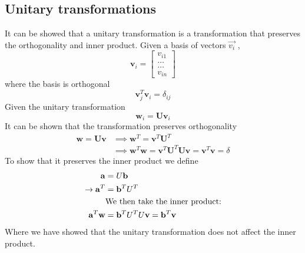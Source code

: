 \documentclass[%
reprint,
amsmath, 
amssymb, 
aps,]{revtex4-1}
\begin{document}
		\subsection{Unitary transformations} \noindent 
It can be showed that a unitary transformation is a transformation that preserves the orthogonality and inner product. Given a basis of vectors $\vec{v_i}$ ,
			\begin{equation*}
	\mathbf{v}_i = \begin{bmatrix} v_{i1} \\ \dots \\ \dots \\v_{in} \end{bmatrix}
			\end{equation*}
where the basis is orthogonal 
			\begin{equation*}
	\mathbf{v}_j^T\mathbf{v}_i = \delta_{ij}
			\end{equation*}
Given the unitary transformation 
			\begin{equation*}
	\mathbf{w}_i=\mathbf{U}\mathbf{v}_i
			\end{equation*}
It can be shown that the transformation preserves orthogonality
			\begin{align*}
	\mathbf{w}=\mathbf{U}\mathbf{v} &\implies \mathbf{w}^T=\mathbf{v}^T\mathbf{U}^T \\ &\implies \mathbf{w}^T\mathbf{w} = \mathbf{v}^T\mathbf{U}^T\mathbf{U}\mathbf{v} = \mathbf{v}^T\mathbf{v} = \delta
			\end{align*}
To show that it preserves the inner product we define 
			\begin{align*}
	\mathbf{a} &= U\mathbf{b} \\
	\rightarrow \mathbf{a}^T &= \mathbf{b}^TU^T \\
	&\textnormal{We then take the inner product:} \\
	 \mathbf{a}^T\mathbf{w} &= \mathbf{b}^TU^TU\mathbf{v} = \mathbf{b}^T\mathbf{v}
			\end{align*}
Where we have showed that the unitary transformation does not affect the inner product. 
\end{document}
